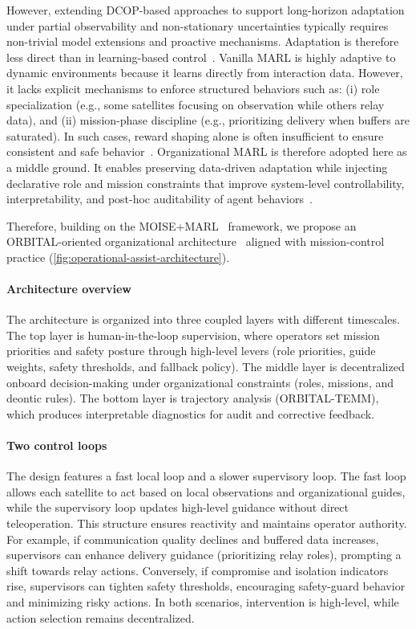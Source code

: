 \documentclass[sigconf]{aamas}
\begin{document}
However, extending DCOP-based approaches to support long-horizon adaptation under partial observability and non-stationary uncertainties typically requires non-trivial model extensions and proactive mechanisms. Adaptation is therefore less direct than in learning-based control~\cite{hoang2022proactive}.
Vanilla MARL is highly adaptive to dynamic environments because it learns directly from interaction data.
However, it lacks explicit mechanisms to enforce structured behaviors such as:
(i) role specialization (e.g., some satellites focusing on observation while others relay data), and
(ii) mission-phase discipline (e.g., prioritizing delivery when buffers are saturated).
In such cases, reward shaping alone is often insufficient to ensure consistent and safe behavior~\cite{DevlinKudenko2016}.
Organizational MARL is therefore adopted here as a middle ground. It enables preserving data-driven adaptation while injecting declarative role and mission constraints that improve system-level controllability, interpretability, and post-hoc auditability of agent behaviors~\cite{soule2024moise_marl}.

Therefore, building on the MOISE+MARL~\cite{soule2024moise_marl} framework, we propose an ORBITAL-oriented organizational architecture~\hyperref[fn:github]{\footnotemark[1]} aligned with mission-control practice (\autoref{fig:operational-assist-architecture}).



\paragraph{Architecture overview}
The architecture is organized into three coupled layers with different timescales. The top layer is human-in-the-loop supervision, where operators set mission priorities and safety posture through high-level levers (role priorities, guide weights, safety thresholds, and fallback policy). The middle layer is decentralized onboard decision-making under organizational constraints (roles, missions, and deontic rules). The bottom layer is trajectory analysis (ORBITAL-TEMM), which produces interpretable diagnostics for audit and corrective feedback.

\paragraph{Two control loops}
The design features a fast local loop and a slower supervisory loop. The fast loop allows each satellite to act based on local observations and organizational guides, while the supervisory loop updates high-level guidance without direct teleoperation. This structure ensures reactivity and maintains operator authority.
%
For example, if communication quality declines and buffered data increases, supervisors can enhance delivery guidance (prioritizing relay roles), prompting a shift towards relay actions. Conversely, if compromise and isolation indicators rise, supervisors can tighten safety thresholds, encouraging safety-guard behavior and minimizing risky actions. In both scenarios, intervention is high-level, while action selection remains decentralized.
\end{document}
